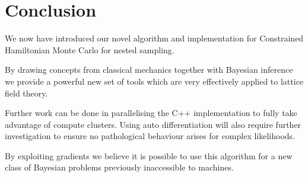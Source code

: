 \documentclass[11pt]{article}
\begin{document}
    \section{Conclusion}\label{sec:conclusion}
    We now have introduced our novel algorithm and implementation for Constrained Hamiltonian Monte Carlo for nested sampling.



    By drawing concepts from classical mechanics together with Bayesian inference we provide a powerful
    new set of tools which are very effectively applied to lattice field theory.

    Further work can be done in parallelising the C++ implementation to fully take advantage of compute clusters.
    Using auto differentiation will also require further investigation to ensure no pathological behaviour arises for
    complex likelihoods.


    By exploiting gradients we believe it is possible to use this algorithm for a new class of
    Bayesian problems previously inaccessible to machines.
\end{document}
